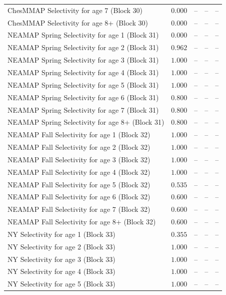 \documentclass[
]{article}
\begin{document}
\begin{landscape}
\begin{longtable}[t]{lrrrr}
ChesMMAP Selectivity for age 7 (Block 30) & $0.000$ & -- & -- & --\\
\addlinespace
ChesMMAP Selectivity for age 8+ (Block 30) & $0.000$ & -- & -- & --\\
NEAMAP Spring Selectivity for age 1 (Block 31) & $0.000$ & -- & -- & --\\
NEAMAP Spring Selectivity for age 2 (Block 31) & $0.962$ & -- & -- & --\\
NEAMAP Spring Selectivity for age 3 (Block 31) & $1.000$ & -- & -- & --\\
NEAMAP Spring Selectivity for age 4 (Block 31) & $1.000$ & -- & -- & --\\
\addlinespace
NEAMAP Spring Selectivity for age 5 (Block 31) & $1.000$ & -- & -- & --\\
NEAMAP Spring Selectivity for age 6 (Block 31) & $0.800$ & -- & -- & --\\
NEAMAP Spring Selectivity for age 7 (Block 31) & $0.800$ & -- & -- & --\\
NEAMAP Spring Selectivity for age 8+ (Block 31) & $0.800$ & -- & -- & --\\
NEAMAP Fall Selectivity for age 1 (Block 32) & $1.000$ & -- & -- & --\\
\addlinespace
NEAMAP Fall Selectivity for age 2 (Block 32) & $1.000$ & -- & -- & --\\
NEAMAP Fall Selectivity for age 3 (Block 32) & $1.000$ & -- & -- & --\\
NEAMAP Fall Selectivity for age 4 (Block 32) & $1.000$ & -- & -- & --\\
NEAMAP Fall Selectivity for age 5 (Block 32) & $0.535$ & -- & -- & --\\
NEAMAP Fall Selectivity for age 6 (Block 32) & $0.600$ & -- & -- & --\\
\addlinespace
NEAMAP Fall Selectivity for age 7 (Block 32) & $0.600$ & -- & -- & --\\
NEAMAP Fall Selectivity for age 8+ (Block 32) & $0.600$ & -- & -- & --\\
NY Selectivity for age 1 (Block 33) & $0.355$ & -- & -- & --\\
NY Selectivity for age 2 (Block 33) & $1.000$ & -- & -- & --\\
NY Selectivity for age 3 (Block 33) & $1.000$ & -- & -- & --\\
\addlinespace
NY Selectivity for age 4 (Block 33) & $1.000$ & -- & -- & --\\
NY Selectivity for age 5 (Block 33) & $1.000$ & -- & -- & --\\

\end{longtable}
\end{landscape}
\end{document}
